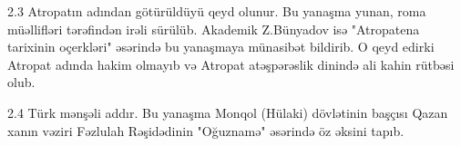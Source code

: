 \documentclass[a4paper,14pt]{article}
\begin{document}
2.3 Atropatın adından götürüldüyü qeyd olunur. Bu yanaşma yunan, roma müəllifləri tərəfindən irəli sürülüb. Akademik Z.Bünyadov isə "Atropatena tarixinin oçerkləri" əsərində bu yanaşmaya münasibət bildirib. O qeyd edirki Atropat adında hakim olmayıb və Atropat atəşpərəslik dinində ali kahin rütbəsi olub.

2.4 Türk mənşəli addır. Bu yanaşma Monqol (Hülaki) dövlətinin başçısı Qazan xanın vəziri Fəzlulah Rəşidədinin "Oğuznamə" əsərində öz əksini tapıb.
\end{document}
